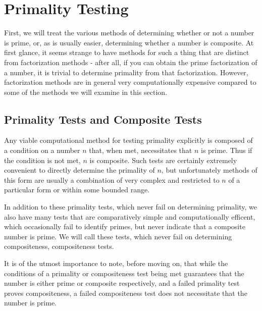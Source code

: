 \documentclass{article}
\begin{document}




\section*{Primality Testing}\label{Primality}

\par First, we will treat the various methods of determining whether or not a number is prime, or, as is usually easier, determining
whether a number is composite. At first glance, it seems strange to have methods for such a thing that are distinct from factorization methods - after all, if you can obtain the prime factorization of a number, it is trivial to determine primality from that factorization. However, factorization methods are in general very computationally expensive compared to some of the methods we will examine in this section. 


\subsection*{ Primality Tests and Composite Tests }

\par Any viable computational method for testing primality explicitly is composed of a condition on a number $n$ that, when met, necessitates that $n$ is prime. Thus if the condition is not met, $n$ is composite. Such tests are certainly extremely convenient to directly determine the primality of $n$, but unfortunately methods of this form are usually a combination of very complex and restricted to $n$ of a particular form or within some bounded range.

\par In addition to these primality tests, which never fail on determining primality, we also have many tests that are comparatively simple and computationally efficent, which occasionally fail to identify primes, but never indicate that a composite number is prime. We will call these tests, which never fail on determining compositeness, compositeness tests.

\par It is of the utmost importance to note, before moving on, that while the conditions of a primality or compositeness test being met guarantees that the number is either prime or composite respectively, and a failed primality test proves compositeness, a failed compositeness test does not necessitate that the number is prime.
\end{document}
